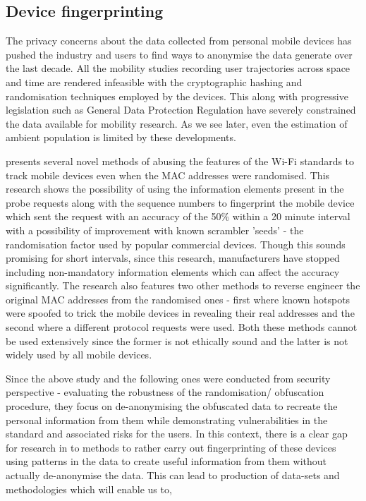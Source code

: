 \subsection{Device fingerprinting}


The privacy concerns about the data collected from personal mobile devices has pushed the industry and users to find ways to anonymise the data generate over the last decade.
All the mobility studies recording user trajectories across space and time are rendered infeasible with the cryptographic hashing and randomisation techniques employed by the devices. 
This along with progressive legislation such as General Data Protection Regulation have severely constrained the data available for mobility research.
As we see later, even the estimation of ambient population is limited by these developments.

\citep{vanhoef2016} presents several novel methods of abusing the features of the Wi-Fi standards to track mobile devices even when the MAC addresses were randomised. This research shows the possibility of using the information elements present in the probe requests along with the sequence numbers to fingerprint the mobile device which sent the request with an accuracy of the 50\% within a 20 minute interval with a possibility of improvement with known scrambler 'seeds' - the randomisation factor used by popular commercial devices. Though this sounds promising for short intervals, since this research, manufacturers have stopped including non-mandatory information elements which can affect the accuracy significantly. The research also features two other methods to reverse engineer the original MAC addresses from the randomised ones - first where known hotspots were spoofed to trick the mobile devices in revealing their real addresses and the second where a different protocol requests were used. Both these methods cannot be used extensively since the former is not ethically sound and the latter is not widely used by all mobile devices. 

Since the above study and the following ones were conducted from security perspective - evaluating the robustness of the randomisation/ obfuscation procedure,
they focus on de-anonymising the obfuscated data to recreate the personal information from them while demonstrating vulnerabilities in the standard and associated risks for the users. 
In this context, there is a clear gap for research in to methods to rather carry out  fingerprinting of these devices using patterns in the data to create useful information from them without actually de-anonymise the data.
This can lead to production of data-sets and methodologies which will enable us to,

